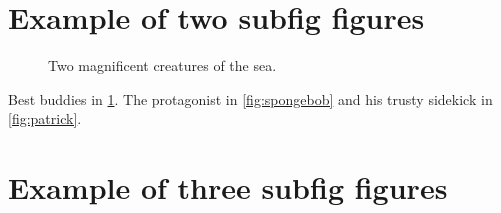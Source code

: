 \documentclass[]{article}
\date{}
\begin{document}
\hypertarget{example-of-two-subfig-figures}{%
\section{Example of two subfig
figures}\label{example-of-two-subfig-figures}}

\begin{figure}
\centering

\hfill {}

\caption{Two magnificent creatures of the sea.}

\label{fig:sbsp}

\end{figure}

Best buddies in \cref{fig:sbsp}. The protagonist in \cref{fig:spongebob}
and his trusty sidekick in \cref{fig:patrick}.

\cleardoublepage

\hypertarget{example-of-three-subfig-figures}{%
\section{Example of three subfig
figures}\label{example-of-three-subfig-figures}}
\end{document}
